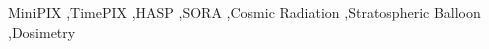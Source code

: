 \documentclass[preprint,review,12pt]{elsarticle}
\begin{document}
\begin{frontmatter}
\begin{keyword}
MiniPIX \sep TimePIX \sep HASP \sep SORA \sep Cosmic Radiation \sep Stratospheric Balloon \sep Dosimetry


\end{keyword}


\end{frontmatter}








%
















\end{document}
